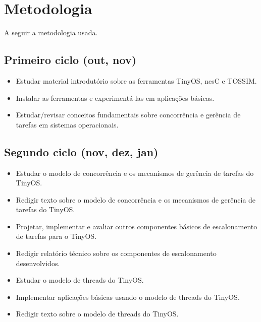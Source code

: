 \documentclass[a4paper,onecolumn, 10pt]{article}
\begin{document}
\pagebreak

\section{Metodologia}\label{metodologia}
A seguir a metodologia usada.

\subsection{Primeiro ciclo (out, nov)}
\begin{itemize}
  \item Estudar material introdutório sobre as ferramentas TinyOS, nesC e TOSSIM.
  \item Instalar as ferramentas e experimentá-las em aplicações básicas.
  \item Estudar/revisar conceitos fundamentais sobre concorrência e gerência de tarefas em sistemas operacionais.
\end{itemize}

\subsection{Segundo ciclo (nov, dez, jan)}
\begin{itemize}
  \item Estudar o modelo de concorrência e os mecanismos de gerência de tarefas do TinyOS.
  \item Redigir texto sobre o modelo de concorrência e os mecanismos de gerência de
  tarefas do TinyOS.
  \item Projetar, implementar e avaliar outros componentes básicos de escalonamento de
  tarefas para o TinyOS.
  \item Redigir relatório técnico sobre os componentes de escalonamento desenvolvidos.
  \item Estudar o modelo de threads do TinyOS.
  \item Implementar aplicações básicas usando o modelo de threads do TinyOS.
  \item Redigir texto sobre o modelo de threads do TinyOS.
\end{itemize}
\end{document}
